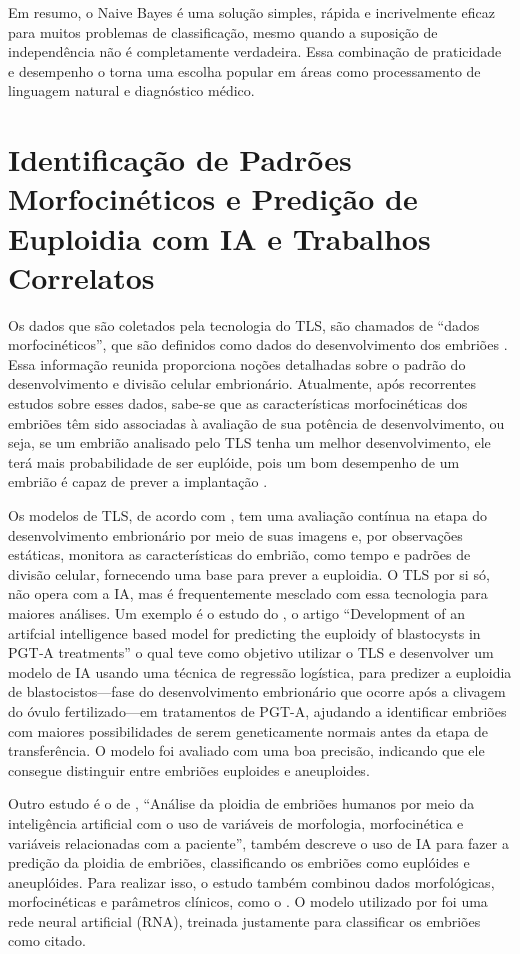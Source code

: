 Em resumo, o Naive Bayes é uma solução simples, rápida e incrivelmente eficaz para muitos problemas de classificação, mesmo quando a suposição de independência não é completamente verdadeira. Essa combinação de praticidade e desempenho o torna uma escolha popular em áreas como processamento de linguagem natural e diagnóstico médico.

\section{Identificação de Padrões Morfocinéticos e Predição de Euploidia com IA e Trabalhos Correlatos}

Os dados que são coletados pela tecnologia do TLS, são chamados de “dados morfocinéticos”, que são definidos como dados do desenvolvimento dos embriões \cite{oliveira2024}. Essa informação reunida proporciona noções detalhadas sobre o padrão do desenvolvimento e divisão celular embrionário. Atualmente, após recorrentes estudos sobre esses dados, sabe-se que as características morfocinéticas dos embriões têm sido associadas à avaliação de sua potência de desenvolvimento, ou seja, se um embrião analisado pelo TLS tenha um melhor desenvolvimento, ele terá mais probabilidade de ser euplóide, pois um bom desempenho de um embrião é capaz de prever a implantação \cite{yuan2023}.

Os modelos de TLS, de acordo com , tem uma avaliação contínua na etapa do desenvolvimento embrionário por meio de suas imagens e, por observações estáticas, monitora as características do embrião, como tempo e padrões de divisão celular, fornecendo uma base para prever a euploidia. O TLS por si só, não opera com a IA, mas é frequentemente mesclado com essa tecnologia para maiores análises. Um exemplo é o estudo do , o artigo “Development of an artifcial intelligence based model for predicting the euploidy of blastocysts in PGT‐A treatments” o qual teve como objetivo utilizar o TLS e desenvolver um modelo de IA usando uma técnica de regressão logística, para predizer a euploidia de blastocistos—fase do desenvolvimento embrionário que ocorre após a clivagem do óvulo fertilizado—em tratamentos de PGT-A, ajudando a identificar embriões com maiores possibilidades de serem geneticamente normais antes da etapa de transferência. O modelo foi avaliado com uma boa precisão, indicando que ele consegue distinguir entre embriões euploides e aneuploides.

Outro estudo é o de , “Análise da ploidia de embriões humanos por meio da inteligência artificial com o uso de variáveis de morfologia, morfocinética e variáveis relacionadas com a paciente”, também descreve o uso de IA para fazer a predição da ploidia de embriões, classificando os embriões como euplóides e aneuplóides. Para realizar isso, o estudo também combinou dados morfológicas, morfocinéticas e parâmetros clínicos, como o . O modelo utilizado por foi uma rede neural artificial (RNA), treinada justamente para classificar os embriões como citado.

